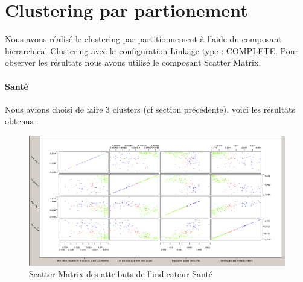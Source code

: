 \section{Clustering par partionement}
Nous avons réalisé le clustering par partitionnement à l'aide du composant hierarchical Clustering avec la configuration Linkage type : COMPLETE. Pour observer les résultats nous avons utilisé le composant Scatter Matrix.

\paragraph{Santé}
Nous avions choisi de faire 3 clusters (cf section précédente), voici les résultats obtenus : 

\begin{figure}[H]
	\begin{center}
		\includegraphics[scale=0.5]{Image/ScatterMatrixSanteNoMissing2}
		\caption{Scatter Matrix des attributs de l'indicateur Santé \jeuc}
	\end{center}
\end{figure}

